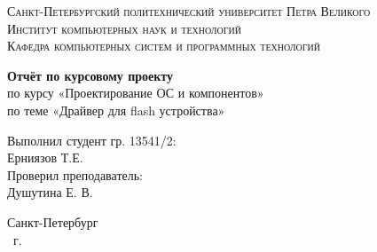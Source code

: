 \begin{titlepage}
    \centering
    \textsc{Санкт-Петербургский политехнический университет Петра Великого}\\[3mm]
    \textsc{Институт компьютерных наук и технологий}\\[3mm]
    \textsc{Кафедра компьютерных систем и программных технологий}
	
	\vfill
	
	\textbf{Отчёт по курсовому проекту}\\[3mm]
	по курсу «Проектирование ОС и компонентов»\\[3mm]
	по теме «Драйвер для flash устройства»\\[41mm]
	
    \begin{flushright}
	\begin{minipage}{.35\textwidth}
		Выполнил студент гр. 13541/2:\\
		Ерниязов Т.Е.\\[3mm]
		Проверил преподаватель:\\
		Душутина Е. В.
	\end{minipage}
    \end{flushright}
	
	\vfill

	Санкт-Петербург\\
	\the\year\ г.
\end{titlepage}
